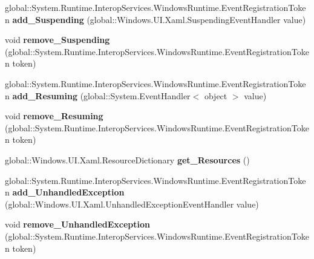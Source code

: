 \begin{DoxyCompactItemize}
global\+::\+System.\+Runtime.\+Interop\+Services.\+Windows\+Runtime.\+Event\+Registration\+Token {\bfseries add\+\_\+\+Suspending} (global\+::\+Windows.\+U\+I.\+Xaml.\+Suspending\+Event\+Handler value)
\item 
\mbox{\label{interface_windows_1_1_u_i_1_1_xaml_1_1_i_application_a2d065fda78dfbe6343b98c8c19648fcf}} 
void {\bfseries remove\+\_\+\+Suspending} (global\+::\+System.\+Runtime.\+Interop\+Services.\+Windows\+Runtime.\+Event\+Registration\+Token token)
\item 
\mbox{\label{interface_windows_1_1_u_i_1_1_xaml_1_1_i_application_adad8e0f1037225acc55bfcc1272edcd4}} 
global\+::\+System.\+Runtime.\+Interop\+Services.\+Windows\+Runtime.\+Event\+Registration\+Token {\bfseries add\+\_\+\+Resuming} (global\+::\+System.\+Event\+Handler$<$ object $>$ value)
\item 
\mbox{\label{interface_windows_1_1_u_i_1_1_xaml_1_1_i_application_a3388b85af6dfd9f47abf5dbfe7274acb}} 
void {\bfseries remove\+\_\+\+Resuming} (global\+::\+System.\+Runtime.\+Interop\+Services.\+Windows\+Runtime.\+Event\+Registration\+Token token)
\item 
\mbox{\label{interface_windows_1_1_u_i_1_1_xaml_1_1_i_application_af85326d17430aa8cf53216ec4beb0251}} 
global\+::\+Windows.\+U\+I.\+Xaml.\+Resource\+Dictionary {\bfseries get\+\_\+\+Resources} ()
\item 
\mbox{\label{interface_windows_1_1_u_i_1_1_xaml_1_1_i_application_ae4f5867a120030fd6bfe6cf03786a52d}} 
global\+::\+System.\+Runtime.\+Interop\+Services.\+Windows\+Runtime.\+Event\+Registration\+Token {\bfseries add\+\_\+\+Unhandled\+Exception} (global\+::\+Windows.\+U\+I.\+Xaml.\+Unhandled\+Exception\+Event\+Handler value)
\item 
\mbox{\label{interface_windows_1_1_u_i_1_1_xaml_1_1_i_application_ab5826c25b60c9dc3ea4c0dff5937ea55}} 
void {\bfseries remove\+\_\+\+Unhandled\+Exception} (global\+::\+System.\+Runtime.\+Interop\+Services.\+Windows\+Runtime.\+Event\+Registration\+Token token)

\end{DoxyCompactItemize}
